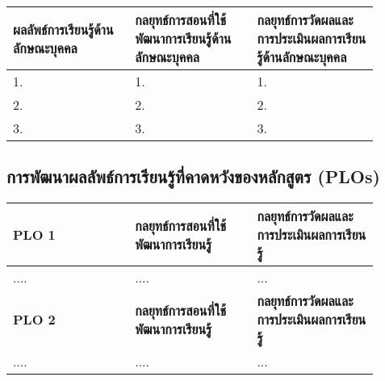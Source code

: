 \begin{landscape}
 \par\noindent\bigskip
 \renewcommand{\arraystretch}{1.3}
 \begin{tabular}{|p{0.3\linewidth}|p{0.3\linewidth}|p{0.3\linewidth}|}
\hline
\textbf{ผลลัพธ์การเรียนรู้ด้านลักษณะบุคคล} & \textbf{กลยุทธ์การสอนที่ใช้พัฒนาการเรียนรู้ด้านลักษณะบุคคล} & \textbf{กลยุทธ์การวัดผลและการประเมินผลการเรียนรู้ด้านลักษณะบุคคล} \\
\hline 
1. & 1. & 1. \\ \hline
2. & 2. & 2. \\ \hline
3. & 3. & 3. \\ \hline
 \end{tabular} 
 
 
\subsection{การพัฒนาผลลัพธ์การเรียนรู้ที่คาดหวังของหลักสูตร (PLOs)}
 
 \par\noindent\bigskip
 \renewcommand{\arraystretch}{1.3}
 \begin{tabular}{|p{0.3\linewidth}|p{0.3\linewidth}|p{0.3\linewidth}|}
 \hline
 \textbf{PLO 1} & \textbf{กลยุทธ์การสอนที่ใช้พัฒนาการเรียนรู้} & \textbf{กลยุทธ์การวัดผลและการประเมินผลการเรียนรู้} \\ 
 \hline
 .... & .... & ... \\
 \hline
  \textbf{PLO 2} & \textbf{กลยุทธ์การสอนที่ใช้พัฒนาการเรียนรู้} & \textbf{กลยุทธ์การวัดผลและการประเมินผลการเรียนรู้} \\ 
 \hline
 .... & .... & ... \\
 \hline
 \end{tabular}

 \end{landscape}
 
 
 
 
 
 
 
 
 
 
 
 